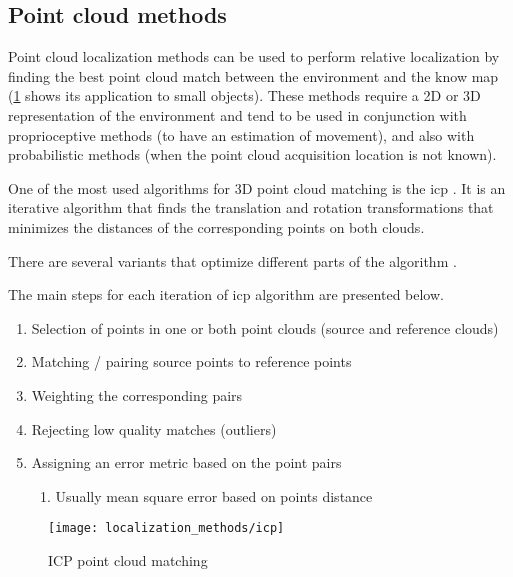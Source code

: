 \subsection{Point cloud methods}

Point cloud localization methods can be used to perform relative localization by finding the best point cloud match between the environment and the know map (\cref{fig:localization-methods_icp} shows its application to small objects). These methods require a 2D or 3D representation of the environment and tend to be used in conjunction with proprioceptive methods (to have an estimation of movement), and also with probabilistic methods (when the point cloud acquisition location is not known).

One of the most used algorithms for 3D point cloud matching is the \gls{icp} \cite{Besl1992,Jez2008,Zhang1992,Bouaziz2013,Chetverikov2002,Djehaich2013,Zhou2011}. It is an iterative algorithm that finds the translation and rotation transformations that minimizes the distances of the corresponding points on both clouds.

There are several variants that optimize different parts of the algorithm \cite{Rusinkiewicz2001}.

The main steps for each iteration of \gls{icp} algorithm are presented below.

\begin{enumerate}
\item  Selection of points in one or both point clouds (source and reference clouds)
\item  Matching / pairing source points to reference points
\item  Weighting the corresponding pairs
\item  Rejecting low quality matches (outliers)
\item  Assigning an error metric based on the point pairs

\begin{enumerate}
\item  Usually mean square error based on points distance
\end{enumerate}

\end{enumerate}


\begin{figure}[H]
	\centering
	\texttt{[image: localization\_methods/icp]}
	\caption{ICP point cloud matching\protect\footnotemark}
	\label{fig:localization-methods_icp}
\end{figure}


